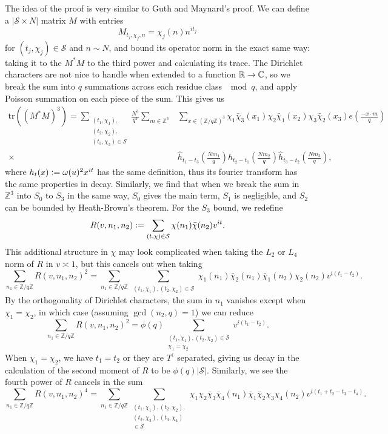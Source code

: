 The idea of the proof is very similar to Guth and Maynard's proof. We can define a $|\mathcal{S}\times N|$ matrix $M$ with entries
\[
    M_{t_j,\chi_j,n} = \chi_j(n)n^{it_j}
\]
for $(t_j,\chi_j)\in\mathcal{S}$ and $n\sim N$, and bound its operator norm in the exact same way: taking it to the $M^*M$ to the third power and calculating its trace. The Dirichlet characters are not nice to handle when extended to a function $\mathbb{R} \to \mathbb{C}$, so we break the sum into $q$ summations across each residue class $\mod q$, and apply Poisson summation on each piece of the sum. This gives us \begin{align*}
    \textrm{tr}((M^*M)^3)=\sum_{\substack{(t_1,\chi_1),\\(t_2,\chi_2),\\(t_3,\chi_3)\in\mathcal{S}}}
    \frac{N^3}{q^3}\sum_{m\in\mathbb{Z}^3}&\sum_{x\in (\mathbb{Z}/q\mathbb{Z})^3}\chi_1\bar{\chi}_3(x_1)\chi_2\bar{\chi}_1(x_2)\chi_3\bar{\chi}_2(x_3) e\left(\frac{-x\cdot m}{q}\right)\\
    \times \ &\hat{h}_{t_1-t_3}\left(\frac{Nm_1}{q}\right)\hat{h}_{t_2-t_1}\left(\frac{Nm_2}{q}\right)\hat{h}_{t_3-t_2}\left(\frac{Nm_3}{q}\right),
\end{align*}
where $h_t(x) \mathrel{\mathop:}= \omega(u)^2 x^{it}$ has the same definition, thus its fourier transform has the same properties in decay. Similarly, we find that when we break the sum in $\mathbb{Z}^3$ into $S_0$ to $S_3$ in the same way, $S_0$ gives the main term, $S_1$ is negligible, and $S_2$ can be bounded by Heath-Brown's theorem. For the $S_3$ bound, we redefine \[
R(v,n_1,n_2)\mathrel{\mathop:}= \sum_{(t,\chi)\in\mathcal{S}}\chi(n_1)\bar{\chi}(n_2) v^{it}.
\]
This additional structure in $\chi$ may look complicated when taking the $L_2$ or $L_4$ norm of $R$ in $v\asymp 1$, but this cancels out when taking \[
\sum_{n_1\in\mathbb{Z}/q\mathbb{Z}} R(v,n_1,n_2)^2 = \sum_{n_1\in\mathbb{Z}/q\mathbb{Z}}\sum_{\substack{(t_1,\chi_1),(t_2,\chi_2)\in\mathcal{S}}}\chi_1(n_1)\bar\chi_2(n_1)\bar\chi_1(n_2)\chi_2(n_2) v^{i(t_1-t_2)}.
\]
By the orthogonality of Dirichlet characters, the sum in $n_1$ vanishes except when $\chi_1=\chi_2$, in which case (assuming $\gcd(n_2,q)=1$) we can reduce \[
    \sum_{n_1\in\mathbb{Z}/q\mathbb{Z}} R(v,n_1,n_2)^2 =\phi(q) \sum_{\substack{(t_1,\chi_1),(t_2,\chi_2)\in\mathcal{S}\\\chi_1=\chi_2}}v^{i(t_1-t_2)}.
\]
When $\chi_1=\chi_2$, we have $t_1=t_2$ or they are $T^\epsilon$ separated, giving us decay in the calculation of the second moment of $R$ to be $\phi(q)|\mathcal{S}|$.
Similarly, we see the fourth power of $R$ cancels in the sum \[
    \sum_{n_1\in\mathbb{Z}/q\mathbb{Z}} R(v,n_1,n_2)^4 = \sum_{n_1\in\mathbb{Z}/q\mathbb{Z}}\sum_{\substack{(t_1,\chi_1),(t_2,\chi_2),\\(t_3,\chi_3),(t_4,\chi_4)\\\in\mathcal{S}}}\chi_1\chi_2\bar\chi_3\bar\chi_4(n_1)\bar\chi_1\bar\chi_2\chi_3\chi_4(n_2) v^{i(t_1+t_2-t_3-t_4)}.
\]
